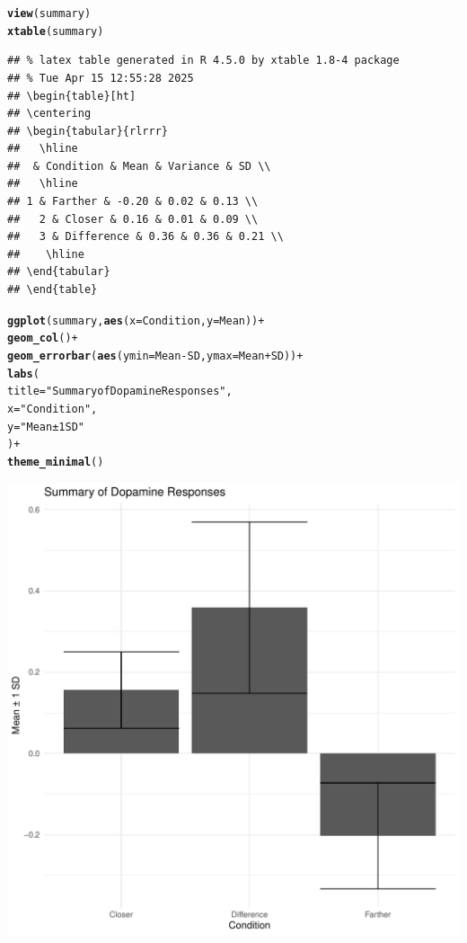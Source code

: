\documentclass{article}\usepackage[]{graphicx}\usepackage[]{xcolor}
\makeatletter
\def\maxwidth{ %
  \ifdim\Gin@nat@width>\linewidth
    \linewidth
  \else
    \Gin@nat@width
  \fi
}
\newcommand{\hlsng}[1]{\textcolor[rgb]{0.192,0.494,0.8}{#1}}%
\newcommand{\hlopt}[1]{\textcolor[rgb]{0,0,0}{#1}}%
\newcommand{\hldef}[1]{\textcolor[rgb]{0.345,0.345,0.345}{#1}}%
\newcommand{\hlkwc}[1]{\textcolor[rgb]{0.333,0.667,0.333}{#1}}%
\newcommand{\hlkwd}[1]{\textcolor[rgb]{0.737,0.353,0.396}{\textbf{#1}}}%
\newenvironment{kframe}{%
 \def\at@end@of@kframe{}%
 \ifinner\ifhmode%
  \def\at@end@of@kframe{\end{minipage}}%
  \begin{minipage}{\columnwidth}%
 \fi\fi%
 \def\FrameCommand##1{\hskip\@totalleftmargin \hskip-\fboxsep
 \colorbox{shadecolor}{##1}\hskip-\fboxsep
     \hskip-\linewidth \hskip-\@totalleftmargin \hskip\columnwidth}%
 \MakeFramed {\advance\hsize-\width
   \@totalleftmargin\z@ \linewidth\hsize
   \@setminipage}}%
 {\par\unskip\endMakeFramed%
 \at@end@of@kframe}
\newenvironment{knitrout}{}{} %
\makeatother
\begin{document}
\begin{enumerate}
\begin{knitrout}
\begin{kframe}
\begin{alltt}
\hlkwd{view}\hldef{(summary)}
\hlkwd{xtable}\hldef{(summary)}
\end{alltt}
\begin{verbatim}
## % latex table generated in R 4.5.0 by xtable 1.8-4 package
## % Tue Apr 15 12:55:28 2025
## \begin{table}[ht]
## \centering
## \begin{tabular}{rlrrr}
##   \hline
##  & Condition & Mean & Variance & SD \\ 
##   \hline
## 1 & Farther & -0.20 & 0.02 & 0.13 \\ 
##   2 & Closer & 0.16 & 0.01 & 0.09 \\ 
##   3 & Difference & 0.36 & 0.36 & 0.21 \\ 
##    \hline
## \end{tabular}
## \end{table}
\end{verbatim}
\begin{alltt}
\hlkwd{ggplot}\hldef{(summary,} \hlkwd{aes}\hldef{(}\hlkwc{x} \hldef{= Condition,} \hlkwc{y} \hldef{= Mean))} \hlopt{+}
  \hlkwd{geom_col}\hldef{()} \hlopt{+}
  \hlkwd{geom_errorbar}\hldef{(}\hlkwd{aes}\hldef{(}\hlkwc{ymin} \hldef{= Mean} \hlopt{-} \hldef{SD,} \hlkwc{ymax} \hldef{= Mean} \hlopt{+} \hldef{SD))} \hlopt{+}
  \hlkwd{labs}\hldef{(}
    \hlkwc{title} \hldef{=} \hlsng{"Summary of Dopamine Responses"}\hldef{,}
    \hlkwc{x} \hldef{=} \hlsng{"Condition"}\hldef{,}
    \hlkwc{y} \hldef{=} \hlsng{"Mean ± 1 SD"}
  \hldef{)} \hlopt{+}
  \hlkwd{theme_minimal}\hldef{()}
\end{alltt}
\end{kframe}
\includegraphics[width=\maxwidth]{figure/unnamed-chunk-4-1} 
\end{knitrout}




\end{enumerate}
\end{document}
